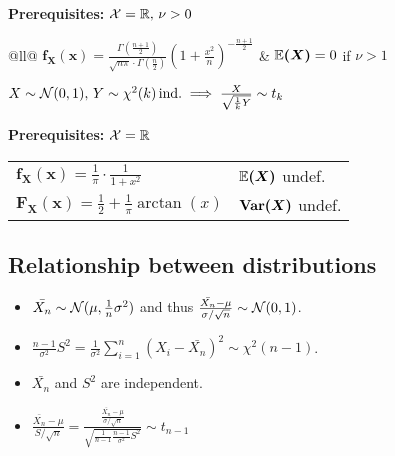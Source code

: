 \begin{cdefinition*}
  \textbf{Prerequisites:} \(\operatorname{\mathcal{X}} = \mathbb{R}, \, \nu > 0\) \\
  \begin{tabularx}{\linewidth}{@{}ll@{}}
    \(\bm{f_X(x)} = \frac{\Gamma\left(\frac{n+1}{2}\right)}{\sqrt{n\pi} \cdot \Gamma(\frac{n}{2})} \left(1+\frac{x^2}{n}\right)^{-\frac{n+1}{2}}\) & \(\bm{\mathbb{E}(X)} = 0 \) if \(\nu > 1\) \\
  \end{tabularx}
\end{cdefinition*}

\begin{lemma}
  \(X \sim \operatorname{\mathcal{N}}(0, 1), \, Y \sim \chi^2(k) \, \text{ind.}\implies \frac{X}{\sqrt{\frac{1}{k}Y}} \sim t_k\)
\end{lemma}

\pagebreak
\begin{cdefinition*}[{Cauchy}]
  \textbf{Prerequisites:} \(\operatorname{\mathcal{X}} = \mathbb{R}\) \\
  \begin{tabularx}{\linewidth}{@{}ll@{}}
    \(\bm{f_X(x)} = \frac{1}{\pi}\cdot \frac{1}{1 + x^2}\) & \(\bm{\mathbb{E}(X)}\) undef. \\
    \(\bm{F_X(x)} = \frac{1}{2} + \frac{1}{\pi} \arctan(x)\) & \(\bm{\Var(X)}\) undef.
  \end{tabularx}
\end{cdefinition*}

\subsection*{Relationship between distributions}
\begin{center}
  
\end{center}

\begin{theorem*}
  \begin{itemize}
    \item \(\bar{X_n} \sim \operatorname{\mathcal{N}}(\mu, \frac{1}{n}\sigma^2)\) and thus \(\frac{\bar{X_n} - \mu}{\sigma / \sqrt{n}} \sim \operatorname{\mathcal{N}}(0, 1)\).
    \item \(\frac{n-1}{\sigma^2}S^2 = \frac{1}{\sigma^2}\sum_{i=1}^n(X_i - \bar{X_n})^2 \sim \chi^2(n-1)\).
    \item \(\bar{X_n}\) and \(S^2\) are independent.
    \item \(\frac{\bar{X_n} - \mu}{S / \sqrt{n}} = \frac{\frac{\bar{X_n} - \mu}{\sigma / \sqrt{n}}}{\sqrt{\frac{1}{n-1} \frac{n-1}{\sigma^2}S^2}} \sim t_{n-1}\)
  \end{itemize}
\end{theorem*}

